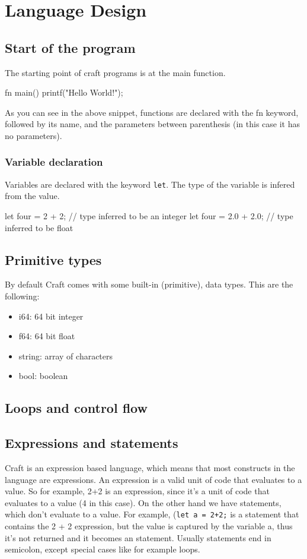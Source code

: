 ﻿\documentclass[10pt,a4paper,twocolumn,twoside]{article}
\begin{document}
\section{Language Design}

\subsection{Start of the program}
The starting point of craft programs is at the main function.

\begin{code}
fn main() {
    printf("Hello World!\n");
}
\end{code}

As you can see in the above snippet, functions are declared with the fn keyword,
followed by its name, and  the parameters between parenthesis (in this case it 
has no parameters).

\subsubsection{Variable declaration}
Variables are declared with the keyword \texttt{let}. The type of the variable
is infered from the value.

\begin{code}
let four = 2 + 2; // type inferred to be an integer
let four = 2.0 + 2.0; // type inferred to be float
\end{code}

\subsection{Primitive types}
By default Craft comes with some built-in (primitive), data types. This are the
following:

\begin{itemize}
    \item i64: 64 bit integer
    \item f64: 64 bit float
    \item string: array of characters
    \item bool: boolean
\end{itemize}

\subsection{Loops and control flow}

\subsection{Expressions and statements}
Craft is an expression based language, which means that most constructs in the
language are expressions. An expression is a valid unit of code that evaluates
to a value. So for example, 2+2 is an expression, since it's a unit of code that
evaluates to a value (4 in this case). On the other hand we have statements,
which don't evaluate to a value. For example, (\texttt{let a = 2+2;} is a
statement that contains the 2 + 2 expression, but the value is captured by the
variable a, thus it's not returned and it becomes an statement. Usually
statements end in semicolon, except special cases like for example loops.
\end{document}
